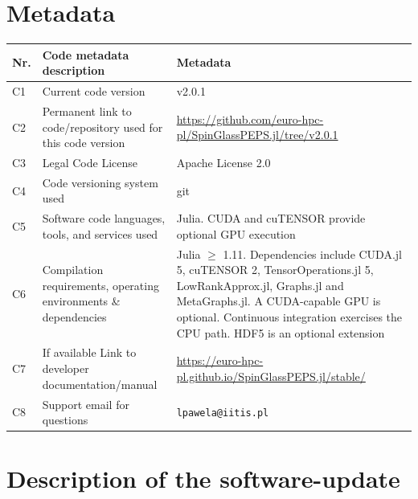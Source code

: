 \documentclass[preprint,12pt,a4paper]{elsarticle}
\begin{document}
\section*{Metadata}
\label{metadata}

\begin{table}[H]
\begin{tabular}{|l|>{\raggedright\arraybackslash}p{5.9cm}|>{\raggedright\arraybackslash}p{5.9cm}|}
\hline
Nr. & Code metadata description & Metadata \\
\hline
C1 & Current code version & v2.0.1 \\
\hline
C2 & Permanent link to code/repository used for this code version &
\url{https://github.com/euro-hpc-pl/SpinGlassPEPS.jl/tree/v2.0.1} \\
\hline
C3 & Legal Code License & Apache License 2.0 \\
\hline
C4 & Code versioning system used & git \\
\hline
C5 & Software code languages, tools, and services used & Julia. CUDA and
cuTENSOR provide optional GPU execution \\
\hline
C6 & Compilation requirements, operating environments \& dependencies & Julia
$\geq$ 1.11. Dependencies include CUDA.jl 5, cuTENSOR 2, TensorOperations.jl 5,
LowRankApprox.jl, Graphs.jl and MetaGraphs.jl. A CUDA-capable GPU is optional.
Continuous integration exercises the CPU path. HDF5 is an optional extension \\
\hline
C7 & If available Link to developer documentation/manual &
\url{https://euro-hpc-pl.github.io/SpinGlassPEPS.jl/stable/} \\
\hline
C8 & Support email for questions & \texttt{lpawela@iitis.pl} \\
\hline
\end{tabular}
\end{table}


\section{Description of the software-update}
\label{Description of the software-update}
\end{document}
